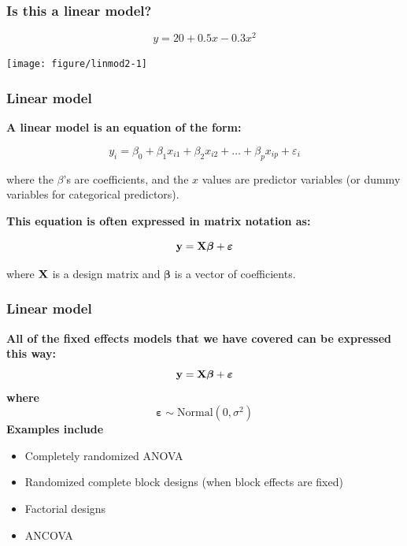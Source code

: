 \documentclass[color=usenames,dvipsnames]{beamer}\usepackage[]{graphicx}\usepackage[]{color}
\begin{document}
\begin{frame}[fragile]
  \frametitle{Is this a linear model?}
\[
y = 20 + 0.5 x - 0.3 x^2
\]

\begin{center}
  \texttt{[image: figure/linmod2-1]}
\end{center}
\end{frame}





\begin{frame}
  \frametitle{Linear model}
{\bf A linear model is an equation of the form:}

\[
y_i = \beta_0 + \beta_1 x_{i1} + \beta_2 x_{i2} + \ldots + \beta_p x_{ip} + \varepsilon_i
\]

where the $\beta$'s are coefficients, and the $x$ values are predictor
variables (or dummy variables for categorical predictors).
\pause

\vspace{0.5cm}

{\bf This equation is often expressed in matrix notation as:}

\[
{\bf y} = {\bf X} {\bm{\beta}} + {\bm \varepsilon}
\]

where $\bf X$ is a \alert{design matrix} and $\bm{\beta}$ is a
vector of coefficients.
\end{frame}






\begin{frame}
  \frametitle{Linear model}
  {\bf All of the fixed effects models that we have covered can be
    expressed this way:}
  \[
  {\bf y} = {\bf X}{\bm \beta} + {\bm \varepsilon}
  \]
  {\bf where}
  \[
  {\bm \varepsilon} \sim \mbox{Normal}(0, \sigma^2)
  \]
  \pause
  \vfill
  {\bf Examples include} \\
  \begin{itemize}
    \item Completely randomized ANOVA
    \item Randomized complete block designs (when block effects are fixed)
    \item Factorial designs
    \item ANCOVA
  \end{itemize}
\end{frame}
\end{document}
